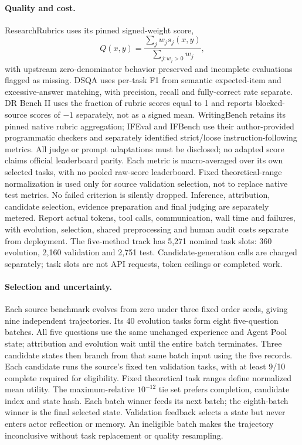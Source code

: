 \documentclass[11pt]{article}
\begin{document}
\paragraph{Quality and cost.}
ResearchRubrics uses its pinned signed-weight score,
\begin{equation}
Q(x,y)=\frac{\sum_jw_js_j(x,y)}{\sum_{j:w_j>0}w_j},
\label{eq:official}
\end{equation}
with upstream zero-denominator behavior preserved and incomplete evaluations flagged as missing. DSQA uses per-task F1 from semantic expected-item and excessive-answer matching, with precision, recall and fully-correct rate separate. DR Bench II uses the fraction of rubric scores equal to 1 and reports blocked-source scores of $-1$ separately, not as a signed mean. WritingBench retains its pinned native rubric aggregation; IFEval and IFBench use their author-provided programmatic checkers and separately identified strict/loose instruction-following metrics. All judge or prompt adaptations must be disclosed; no adapted score claims official leaderboard parity. Each metric is macro-averaged over its own selected tasks, with no pooled raw-score leaderboard. Fixed theoretical-range normalization is used only for source validation selection, not to replace native test metrics. No failed criterion is silently dropped. Inference, attribution, candidate selection, evidence preparation and final judging are separately metered. Report actual tokens, tool calls, communication, wall time and failures, with evolution, selection, shared preprocessing and human audit costs separate from deployment. The five-method track has 5,271 nominal task slots: 360 evolution, 2,160 validation and 2,751 test. Candidate-generation calls are charged separately; task slots are not API requests, token ceilings or completed work.

\paragraph{Selection and uncertainty.}
Each source benchmark evolves from zero under three fixed order seeds, giving nine independent trajectories. Its 40 evolution tasks form eight five-question batches. All five questions use the same unchanged experience and Agent Pool state; attribution and evolution wait until the entire batch terminates. Three candidate states then branch from that same batch input using the five records. Each candidate runs the source's fixed ten validation tasks, with at least 9/10 complete required for eligibility. Fixed theoretical task ranges define normalized mean utility. The maximum-relative $10^{-12}$ tie set prefers completion, candidate index and state hash. Each batch winner feeds its next batch; the eighth-batch winner is the final selected state. Validation feedback selects a state but never enters actor reflection or memory. An ineligible batch makes the trajectory inconclusive without task replacement or quality resampling.
\end{document}
